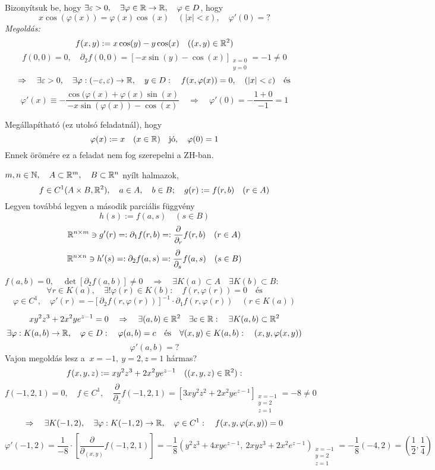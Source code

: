 \documentclass[a4paper,11.5pt]{article}
\begin{document}
	\begin{task}
		Bizonyítsuk be, hogy $\exists\varepsilon>0,\quad \exists\varphi\in\mathbb{R}\to\mathbb{R},\quad \varphi\in D$, hogy
			$$x\cos(\varphi(x))=\varphi(x)\cos(x)\quad (|x|<\varepsilon),\quad \varphi'(0)=?$$
			\textit{Megoldás:}
			\[ f(x,y):=x\cos(y)-y\cos(x)\quad ((x,y)\in\mathbb{R}^2) \]
			\[ f(0,0)=0,\quad \partial_2f(0,0)=[-x\sin(y)-\cos(x)]_{\substack{x=0\\y=0}}=-1\not=0 \]
			\[ \Rightarrow\quad \exists\varepsilon>0,\quad \exists\varphi:(-\varepsilon,\varepsilon)\to\mathbb{R},\quad y\in D:\quad f(x,\varphi(x))=0,\quad (|x|<\varepsilon)\quad \text{és}\]
			\[ \varphi'(x)\equiv -\frac{\cos(\varphi(x)+\varphi(x)\sin(x)}{-x\sin(\varphi(x))-\cos(x)}\quad  \Rightarrow\quad \varphi'(0)=-\frac{1+0}{-1}=1 \]
	\end{task}
	\begin{note}
		Megállapítható (ez utolsó feladatnál), hogy
		\[ \varphi(x):=x\quad (x\in\mathbb{R})\quad \text{jó},\quad \varphi(0)=1 \]
		Ennek örömére ez a feladat nem fog szerepelni a ZH-ban.
	\end{note}
	\begin{note}
		$m,n\in\mathbb{N},\quad A\subset \mathbb{R}^m,\quad B\subset \mathbb{R}^n$ nyílt halmazok,
		\[ f\in C^1(A\times B,\mathbb{R}^2),\quad a\in A,\quad b\in B;\quad g(r):=f(r,b)\quad (r\in A) \]
		Legyen továbbá legyen a második parciális függvény 
		\[ h(s):=f(a,s)\quad (s\in B) \]
		\[ \mathbb{R}^{n\times m}\ni g'(r)=:\partial_1f(r,b)=:\frac{\partial}{\partial_r}f(r,b)\quad (r\in A) \]
		\[ \mathbb{R}^{n\times n}\ni h'(s)=:\partial_2f(a,s)=:\frac{\partial}{\partial_s}f(a,s)\quad (s\in B) \]
	\end{note}
	\begin{theorem}
		$f(a,b)=0,\quad \det[\partial_2f(a,b)]\not=0\quad \Rightarrow\quad \exists  K (a)\subset A\quad \exists  K (b)\subset B:$
		\[ \forall r\in  K (a),\quad \exists!\varphi(r)\in  K (b):\quad f(r,\varphi(r))=0\quad \text{és}\]
		\[ \varphi\in C^1,\quad \varphi'(r)=-[\partial_2f(r,\varphi(r))]^{-1}\cdot\partial_1f(r,\varphi(r))\quad (r\in  K (a)) \]
	\end{theorem}
	\begin{task}
		\[ xy^2z^3+2x^2ye^{z-1}=0\quad \Rightarrow\quad \exists(a,b)\in\mathbb{R}^2\quad \exists c\in\mathbb{R}:\quad \exists  K (a,b)\subset\mathbb{R}^2 \]
		\[ \exists\varphi: K (a,b)\to\mathbb{R},\quad \varphi\in D:\quad \varphi(a,b)=c\quad \text{és}\quad \forall(x,y)\in K (a,b):\quad (x,y,\varphi(x,y))\]
		\[ \varphi'(a,b)=? \]
		Vajon megoldás lesz a $\ x=-1,\ y=2, z=1$ hármas?
		\[ f(x,y,z):=xy^2z^3+2x^2ye^{z-1}\quad ((x,y,z)\in\mathbb{R}^2): \]
		\[ f(-1,2,1)=0,\quad f\in C^1,\quad \frac{\partial}{\partial_z}f(-1,2,1)=\left[3xy^2z^2+2x^2ye^{z-1}\right]_{\substack{x=-1\\y=2\\z=1}}=-8\not=0 \]
		\[ \Rightarrow\quad \exists K (-1,2),\quad \exists\varphi: K (-1,2)\to\mathbb{R},\quad \varphi\in C^1:\quad f(x,y,\varphi(x,y))=0 \]
		\[ \varphi'(-1,2)=\frac{1}{-8}\cdot\left[\frac{\partial}{\partial_{(x,y)}}f(-1,2,1)\right]=-\frac{1}{8}\left(y^2z^3+4xye^{z-1},\ 2xyz^3+2x^2e^{z-1}\right)_{\substack{x=-1\\y=2\\z=1}}=-\frac{1}{8}(-4,2)=\left(\frac{1}{2},\frac{1}{4}\right) \]
	\end{task}
\end{document}
